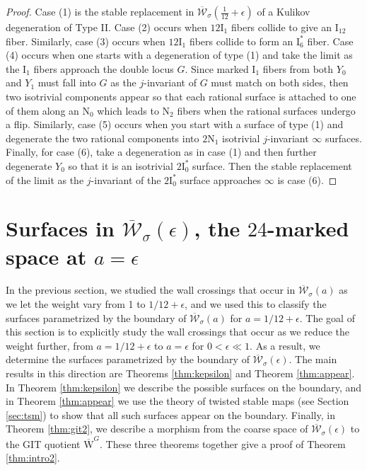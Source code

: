 \documentclass[11pt]{amsart}
\theoremstyle{definition}
\theoremstyle{remark}
\newcommand{\calW}{\mathcal W}
\newcommand{\oMG}{\overline{\mathrm{W}}^G}
\newcommand{\ska}{\overline{\calW}_\sigma(a)}
\newcommand{\ktwelve}{\overline{\calW}_\sigma({\frac{1}{12}+\epsilon})}
\newcommand{\kepsilon}{\overline{\mathcal{W}}_\sigma(\epsilon)}
\begin{document}
	\begin{proof} Case (1) is the stable replacement in $\ktwelve$ of a Kulikov degeneration of Type II. Case (2) occurs when $12\mathrm{I}_1$ fibers collide to give an $\mathrm{I}_{12}$ fiber. Similarly, case (3) occurs when $12\mathrm{I}_1$ fibers collide to form an $\mathrm{I}_6^*$ fiber. Case (4) occurs when one starts with a degeneration of type (1) and take the limit as the $\mathrm{I}_1$ fibers approach the double locus $G$. Since marked $\mathrm{I}_1$ fibers from both $Y_0$ and $Y_1$ must fall into $G$ as the $j$-invariant of $G$ must match on both sides, then two isotrivial components appear so that each rational surface is attached to one of them along an $\mathrm{N}_0$ which leads to $\mathrm{N}_2$ fibers when the rational surfaces undergo a flip. Similarly, case (5) occurs when you start with a surface of type (1) and degenerate the two rational components into $2\mathrm{N}_1$ isotrivial $j$-invariant $\infty$ surfaces. Finally, for case (6), take a degeneration as in case (1) and then further degenerate $Y_0$ so that it is an isotrivial $2\mathrm{I}_0^*$ surface. Then the stable replacement of the limit as the $j$-invariant of the $2\mathrm{I}_0^*$ surface approaches $\infty$ is case (6).  \end{proof}
	
	
	\section{Surfaces in $\kepsilon$, the $24$-marked space at $a = \epsilon$}\label{sec:epsilon}
	
	In the previous section, we studied the wall crossings that occur in $\ska$ as we let the weight vary from 1 to $1/12 + \epsilon$, and we used this to classify the surfaces parametrized by the boundary of $\ska$ for $a = 1/12 + \epsilon$. The goal of this section is to explicitly study the wall crossings that occur as we reduce the weight further, from $a = 1/12 + \epsilon$ to $a = \epsilon$ for $0 < \epsilon \ll 1$. As a result, we determine the surfaces parametrized by the boundary of $\kepsilon$. The main results in this direction are Theorems \ref{thm:kepsilon} and Theorem \ref{thm:appear}. In Theorem \ref{thm:kepsilon} we describe the possible surfaces on the boundary, and in Theorem \ref{thm:appear} we use the theory of twisted stable maps (see Section \ref{sec:tsm}) to show that all such surfaces appear on the boundary. Finally, in Theorem \ref{thm:git2}, we describe a morphism from the coarse space of $\kepsilon$ to the GIT quotient $\oMG$. These three theorems together give a proof of Theorem \ref{thm:intro2}.\\
	
\end{document}
